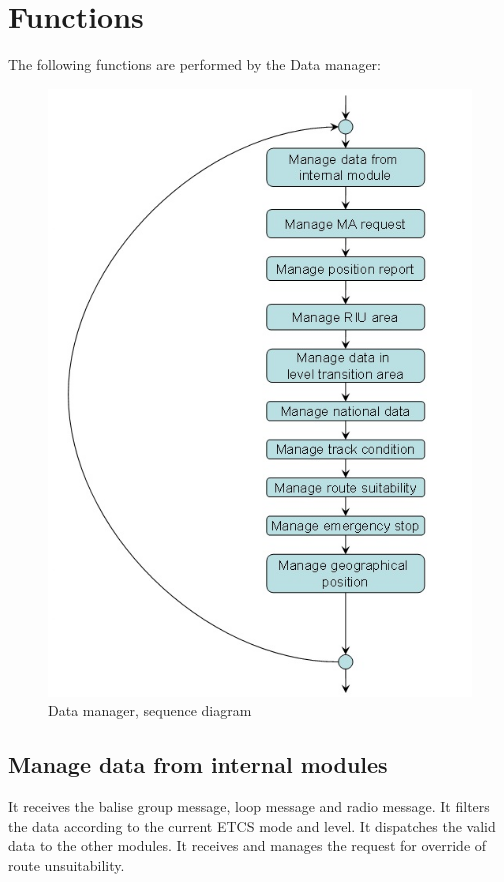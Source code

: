 \documentclass[nocc]{template/openetcs_report}
\begin{document}
\section{Functions}
The following functions are performed by the Data manager:
\begin{figure}[!h]
  \centering
  \includegraphics[width=\textwidth]{image/evc_data_manager}
  \caption{Data manager, sequence diagram}
  \label{fig:Data manager, sequence diagram}
\end{figure}
\subsection{Manage data from internal modules}
It receives the balise group message, loop message and radio message. It filters the data according to the current ETCS mode and level. It dispatches the valid data to the other modules.
It receives and manages the request for override of route unsuitability.
\end{document}
